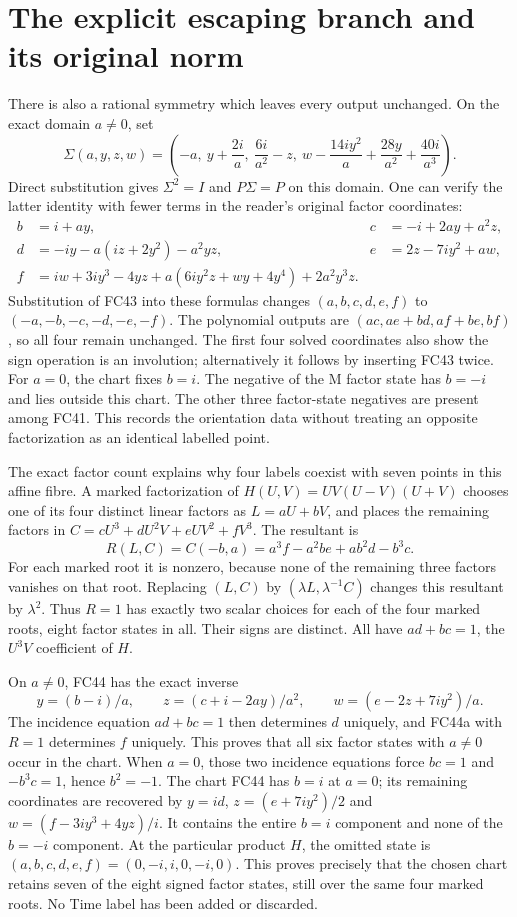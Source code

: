 \section{The explicit escaping branch and its original norm}
There is also a rational symmetry which leaves every output unchanged.
On the exact domain $a\ne0$, set
\[
 \Sigma(a,y,z,w)=\left(-a,\ y+\frac{2i}{a},\
 \frac{6i}{a^2}-z,\
 w-\frac{14iy^2}{a}+\frac{28y}{a^2}+\frac{40i}{a^3}\right).
 \tag{FC43}
\]
Direct substitution gives $\Sigma^2=I$ and $P\Sigma=P$ on this
domain. One can verify the latter identity with fewer terms in the
reader's original factor coordinates:
\[
\begin{aligned}
 b&=i+ay,&c&=-i+2ay+a^2z,\\
 d&=-iy-a(iz+2y^2)-a^2yz,&e&=2z-7iy^2+aw,\\
 f&=iw+3iy^3-4yz+a(6iy^2z+wy+4y^4)+2a^2y^3z.
\end{aligned}\tag{FC44}
\]
Substitution of FC43 into these formulas changes
$(a,b,c,d,e,f)$ to $(-a,-b,-c,-d,-e,-f)$.
The polynomial outputs are $(ac,ae+bd,af+be,bf)$, so all four
remain unchanged. The first four solved coordinates also show the
sign operation is an involution; alternatively it follows by inserting
FC43 twice. For $a=0$, the chart fixes $b=i$. The negative of the
$\mathrm M$ factor state has $b=-i$ and lies outside this chart.
The other three factor-state negatives are present among FC41.
This records the orientation data without treating an opposite
factorization as an identical labelled point.

The exact factor count explains why four labels coexist with seven
points in this affine fibre. A marked factorization of
$H(U,V)=UV(U-V)(U+V)$ chooses one of its four distinct linear factors
as $L=aU+bV$, and places the remaining factors in
$C=cU^3+dU^2V+eUV^2+fV^3$. The resultant is
\[
 R(L,C)=C(-b,a)=a^3f-a^2be+ab^2d-b^3c.
 \tag{FC44a}
\]
For each marked root it is nonzero, because none of the remaining
three factors vanishes on that root. Replacing $(L,C)$ by
$(\lambda L,\lambda^{-1}C)$ changes this resultant by $\lambda^2$.
Thus $R=1$ has exactly two scalar choices for each of the four
marked roots, eight factor states in all. Their signs are distinct.
All have $ad+bc=1$, the $U^3V$ coefficient of $H$.

On $a\ne0$, FC44 has the exact inverse
\[
 y=(b-i)/a,\qquad z=(c+i-2ay)/a^2,\qquad
 w=(e-2z+7iy^2)/a.
 \tag{FC44b}
\]
The incidence equation $ad+bc=1$ then determines $d$ uniquely, and
FC44a with $R=1$ determines $f$ uniquely. This proves that all six
factor states with $a\ne0$ occur in the chart. When $a=0$, those two
incidence equations force $bc=1$ and $-b^3c=1$, hence $b^2=-1$.
The chart FC44 has $b=i$ at $a=0$; its remaining coordinates are
recovered by $y=id$, $z=(e+7iy^2)/2$ and
$w=(f-3iy^3+4yz)/i$. It contains the entire $b=i$ component and none
of the $b=-i$ component. At the particular product $H$, the omitted
state is $(a,b,c,d,e,f)=(0,-i,i,0,-i,0)$. This proves precisely that
the chosen chart retains seven of the eight signed factor states,
still over the same four marked roots. No Time label has been added
or discarded.

